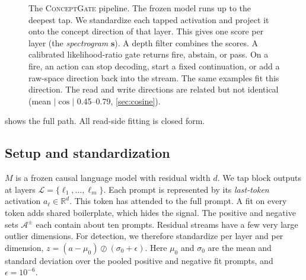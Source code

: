 \documentclass[11pt]{article}
\newcommand{\cg}{\textsc{ConceptGate}}
\newcommand{\raw}{\mathrm{raw}}
\begin{document}
\begin{figure}[t]
\caption{The \cg{} pipeline. The frozen model runs up to the deepest tap. We standardize each tapped
activation and project it onto the concept direction of that layer. This gives one score per layer (the
\emph{spectrogram} $\mathbf{s}$). A depth filter combines the scores. A calibrated likelihood-ratio gate
returns fire, abstain, or pass. On a fire, an action can stop decoding, start a fixed continuation, or add
a raw-space direction back into the stream. The same examples fit this direction. The read and write
directions are related but not identical (mean $|\cos|$ 0.45--0.79, \cref{sec:cosine}).}
\label{fig:pipeline}
\end{figure}

 shows the full path. All read-side fitting is closed form.

\subsection{Setup and standardization}
$M$ is a frozen causal language model with residual width $d$. We tap block outputs at layers
$\mathcal{L}=\{\ell_1,\dots,\ell_m\}$. Each prompt is represented by its \emph{last-token} activation
$a_\ell\in\mathbb{R}^d$. This token has attended to the full prompt. A fit on every token adds shared
boilerplate, which hides the signal. The positive and negative sets $\mathcal{A}^{\pm}$ each contain about
ten prompts. Residual streams have a few very large outlier dimensions. For detection, we therefore standardize per layer and per dimension, $z=(a-\mu_0)\oslash(\sigma_0+\epsilon)$. Here $\mu_0$ and $\sigma_0$ are the mean
and standard deviation over the pooled positive and negative fit prompts, and $\epsilon=10^{-6}$.
\end{document}
